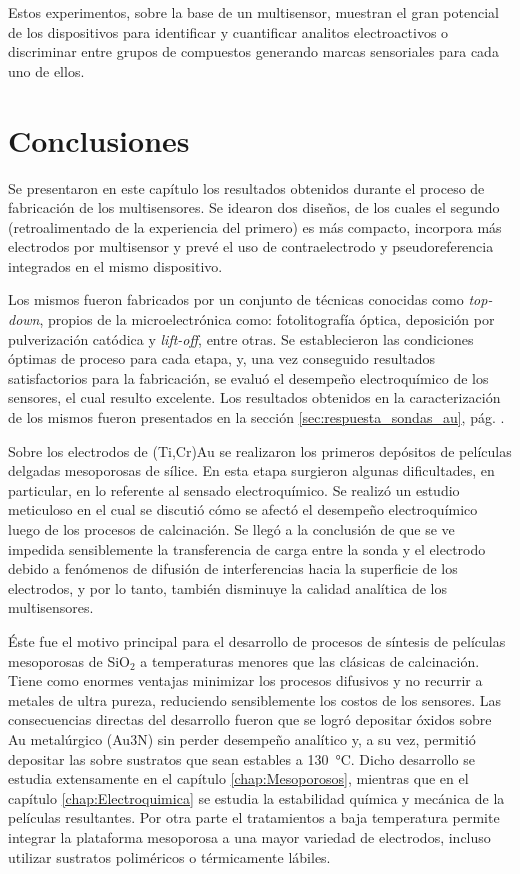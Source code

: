 		 Estos experimentos, sobre la base de un multisensor, muestran el gran potencial de los dispositivos para identificar y cuantificar analitos electroactivos o discriminar entre grupos de compuestos generando marcas sensoriales para cada uno de ellos. 
					     
\section{Conclusiones}

	Se presentaron en este capítulo los resultados obtenidos durante el proceso de fabricación de los multisensores. Se idearon dos diseños, de los cuales el segundo (retroalimentado de la experiencia del primero) es más compacto, incorpora más electrodos por multisensor y prevé el uso de contraelectrodo y pseudoreferencia integrados en el mismo dispositivo.
	
	Los mismos fueron fabricados por un conjunto de técnicas conocidas como \textit{top-down}, propios de la microelectrónica como: fotolitografía óptica, deposición por pulverización catódica y \textit{lift-off}, entre otras. Se establecieron las condiciones óptimas de proceso para cada etapa, y, una vez conseguido resultados satisfactorios para la fabricación, se evaluó el desempeño electroquímico de los sensores, el cual resulto excelente. Los resultados obtenidos en la caracterización de los mismos fueron presentados en la sección \ref{sec:respuesta_sondas_au}, pág. \pageref{sec:respuesta_sondas_au}. 

	Sobre los electrodos de (Ti,Cr)\textbar Au se realizaron los primeros depósitos de películas delgadas mesoporosas de sílice. En esta etapa surgieron algunas dificultades, en particular, en lo referente al sensado electroquímico. Se realizó un estudio meticuloso en el cual se discutió cómo se afectó el desempeño electroquímico luego de los procesos de calcinación. Se llegó a la conclusión de que se ve impedida sensiblemente la transferencia de carga entre la sonda y el electrodo debido a fenómenos de difusión de interferencias hacia la superficie de los electrodos, y por lo tanto, también disminuye la calidad analítica de los multisensores.

	Éste fue el motivo principal para el desarrollo de procesos de síntesis de películas mesoporosas de SiO$_2$ a temperaturas menores que las clásicas de calcinación. Tiene como enormes ventajas minimizar los procesos difusivos y no recurrir a metales de ultra pureza, reduciendo sensiblemente los costos de los sensores. Las consecuencias directas del desarrollo fueron que se logró depositar óxidos sobre Au metalúrgico (Au3N) sin perder desempeño analítico y, a su vez, permitió depositar las \pdm\space sobre sustratos que sean estables a \SI{130}{\celsius}. Dicho desarrollo se estudia extensamente en el capítulo \ref{chap:Mesoporosos}, mientras que en el capítulo \ref{chap:Electroquimica} se estudia la estabilidad química y mecánica de la películas resultantes. Por otra parte el tratamientos a baja temperatura permite integrar la plataforma mesoporosa a una mayor variedad de electrodos, incluso utilizar sustratos poliméricos o térmicamente lábiles.

